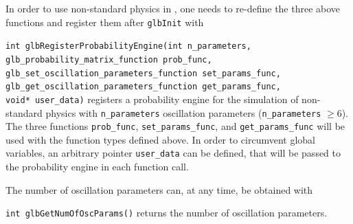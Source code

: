 In order to use non-standard physics in \GLOBES , one needs to re-define the three above functions and register them after {\tt glbInit} with
\begin{function}
{\tt int glbRegisterProbabilityEngine(int n\_parameters,
                 glb\_probability\_matrix\_function prob\_func, \\
                 glb\_set\_oscillation\_parameters\_function set\_params\_func, \\
                 glb\_get\_oscillation\_parameters\_function get\_params\_func, \\
                 void* user\_data)} registers a probability
engine for the simulation of non-standard physics with {\tt n\_parameters} oscillation parameters ({\tt n\_parameters} $\ge6$). The three functions {\tt prob\_func}, {\tt set\_params\_func}, and {\tt get\_params\_func} 
will be used with the function types defined above. In order to circumvent global variables, an arbitrary pointer {\tt user\_data} can be defined, that will be passed to the probability engine in each function call.
\end{function}
The number of oscillation parameters can, at any time, be obtained with
\begin{function}
{\tt  int glbGetNumOfOscParams()} returns the number of oscillation parameters.
\end{function}

